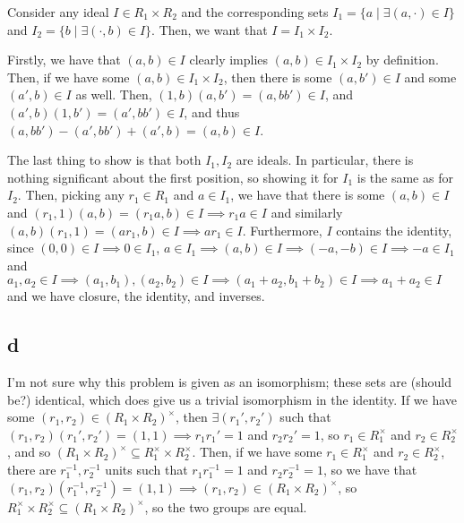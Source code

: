 \documentclass[12pt,letterpaper]{article}
\theoremstyle{definition}
\begin{document}
Consider any ideal $I \in R_{1} \times R_{2}$ and the corresponding sets $I_{1} = \{a \mid \exists (a, \cdot) \in I\}$ and $I_{2} = \{b \mid \exists (\cdot, b) \in I\}$. Then, we want that $I = I_{1} \times I_{2}$.

Firstly, we have that $(a,b) \in I$ clearly implies $(a,b) \in I_{1} \times I_{2}$ by definition. Then, if we have some $(a, b) \in I_{1} \times I_{2}$, then there is some $(a, b') \in I$ and some $(a', b) \in I$ as well. Then, $(1, b)(a, b') = (a, bb') \in I$, and $(a', b)(1, b') = (a', bb') \in I$, and thus $(a, bb') - (a', bb') + (a', b) = (a,b) \in I$.

The last thing to show is that both $I_{1}, I_{2}$ are ideals. In particular, there is nothing significant about the first position, so showing it for $I_{1}$ is the same as for $I_{2}$. Then, picking any $r_{1} \in R_{1}$ and $a \in I_{1}$, we have that there is some $(a,b) \in I$ and $(r_{1}, 1)(a,b) = (r_{1}a, b) \in I \implies r_{1}a \in I$ and similarly $(a,b)(r_{1}, 1) = (ar_{1}, b) \in I \implies ar_{1} \in I$. Furthermore, $I$ contains the identity, since $(0, 0) \in I \implies 0 \in I_{1}$, $a \in I_{1} \implies (a,b) \in I \implies (-a, -b) \in I \implies -a \in I_{1}$ and $a_{1}, a_{2} \in I \implies (a_{1}, b_{1}), (a_{2}, b_{2}) \in I \implies (a_{1} + a_{2}, b_{1} + b_{2}) \in I \implies a_{1} + a_{2} \in I$ and we have closure, the identity, and inverses.

\subsection*{d}

I'm not sure why this problem is given as an isomorphism; these sets are (should be?) identical, which does give us a trivial isomorphism in the identity. If we have some $(r_{1}, r_{2}) \in (R_{1} \times R_{2})^{\times}$, then $\exists (r_{1}', r_{2}')$ such that $(r_{1},r_{2})(r_{1}', r_{2}') = (1,1) \implies r_{1}r_{1}' = 1$ and $r_{2}r_{2}' = 1$, so $r_{1} \in R_{1}^{\times}$ and $r_{2} \in R_{2}^{\times}$, and so $(R_{1} \times R_{2})^{\times} \subseteq R_{1}^{\times} \times R_{2}^{\times}$. Then, if we have some $r_{1} \in R_{1}^{\times}$ and $r_{2} \in R_{2}^{\times}$, there are $r_{1}^{-1}, r_{2}^{-1}$ units such that $r_{1}r_{1}^{-1} = 1$ and $r_{2}r_{2}^{-1} = 1$, so we have that $(r_{1}, r_{2})(r_{1}^{-1}, r_{2}^{-1}) = (1, 1) \implies (r_{1}, r_{2}) \in (R_{1} \times R_{2})^{\times}$, so $R_{1}^{\times} \times R_{2}^{\times} \subseteq (R_{1} \times R_{2})^{\times}$, so the two groups are equal.
\end{document}
